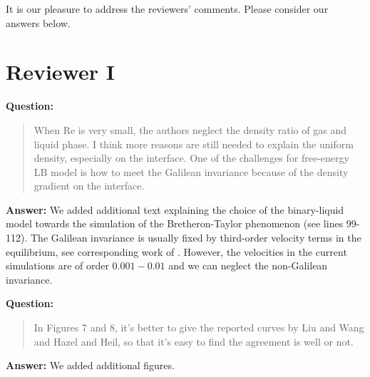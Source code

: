 \documentclass{article}
\begin{document}
It is our pleasure to address the reviewers' comments. Please consider our answers below.
\section{Reviewer I}

\textbf{Question:}
\begin{quotation}
When Re is very small, the authors neglect the density ratio of gas and liquid phase. I think more
reasons are still needed to explain the uniform density, especially on the interface. One of the
challenges for free-energy LB model is how to meet the Galilean invariance because of the density
gradient on the interface.
\end{quotation}

\textbf{Answer:} 
We added additional text explaining the choice of the binary-liquid model towards the simulation
of the Bretheron-Taylor phenomenon (see lines 99-112). The Galilean invariance is usually fixed by
third-order velocity terms in the equilibrium, see corresponding work of \citet{qian-galilean}.
However, the velocities in the current simulations are of order $0.001-0.01$ and we can neglect the
non-Galilean invariance.

\textbf{Question:}
\begin{quotation}
In Figures 7 and 8, it's better to give the reported curves by Liu and Wang and Hazel and Heil, so
that it's easy to find the agreement is well or not.
\end{quotation}
\textbf{Answer:} We added additional figures. 
\end{document}
